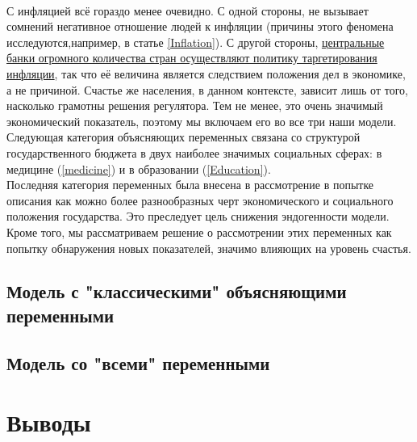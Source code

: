 \documentclass[russian]{vegareport}
\begin{document}
    \\
    С инфляцией всё гораздо менее очевидно. С одной стороны, не вызывает сомнений негативное отношение людей к инфляции (причины этого феномена исследуются,например, в статье \ref{Inflation}). С другой стороны, \href{http://www.centralbanknews.info/p/inflation-targets.html}{центральные банки огромного количества стран осуществляют политику таргетирования инфляции}, так что её величина является следствием положения дел в экономике, а не причиной. Счастье же населения, в данном контексте, зависит лишь от того, насколько грамотны решения регулятора. Тем не менее, это очень значимый экономический показатель, поэтому мы включаем его во все три наши модели.
    \\
    Следующая категория объясняющих переменных связана со структурой государственного бюджета в двух наиболее значимых социальных сферах: в медицине (\ref{medicine}) и в образовании (\ref{Education}). 
    \\
    Последняя категория переменных была внесена в рассмотрение в попытке описания как можно более разнообразных черт экономического и социального положения государства. Это преследует цель снижения эндогенности модели. Кроме того, мы рассматриваем решение о рассмотрении этих переменных как попытку обнаружения новых показателей, значимо влияющих на уровень счастья. 

    \section{Модель с "классическими" объясняющими переменными}
    \section{Модель со "всеми" переменными}
    \chapter{Выводы}
\end{document}
